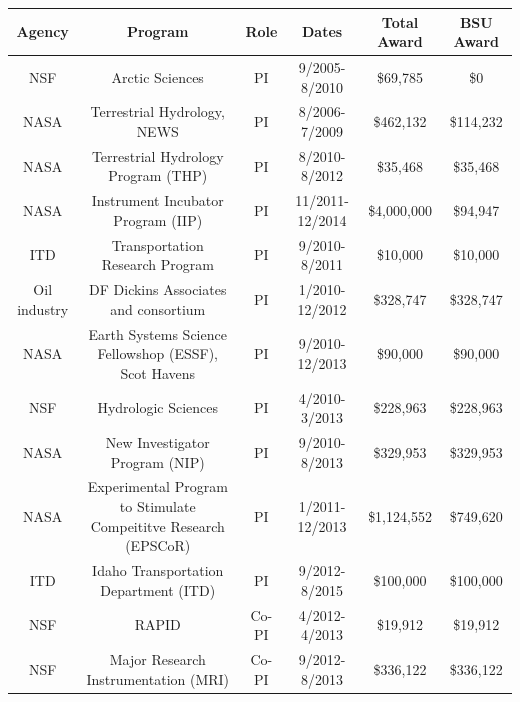 \documentclass[11pt]{article}
\begin{document}
\begin{table}[!htbp]
\tiny
\begin{tabular}{cccccc}
Agency           & Program                                                                 & Role  & Dates            & Total Award & BSU Award \\ \hline
NSF              & Arctic Sciences                                                         & PI    & 9/2005-8/2010    & \$69,785     & \$0  \\
NASA             & Terrestrial Hydrology, NEWS                                             & PI    & 8/2006-7/2009    & \$462,132    & \$114,232  \\
NASA             & Terrestrial Hydrology Program (THP)                                     & PI    & 8/2010-8/2012    & \$35,468     & \$35,468  \\
NASA             & Instrument Incubator Program (IIP)                                      & PI    & 11/2011-12/2014  & \$4,000,000  & \$94,947  \\
ITD              & Transportation Research Program                                         & PI    & 9/2010-8/2011    & \$10,000     & \$10,000 \\
Oil industry     & DF Dickins Associates and consortium                                    & PI    & 1/2010-12/2012   & \$328,747    & \$328,747  \\
NASA             & Earth Systems Science Fellowshop (ESSF), Scot Havens                    & PI    & 9/2010-12/2013   & \$90,000     & \$90,000  \\
NSF              & Hydrologic Sciences                                                     & PI    & 4/2010-3/2013    & \$228,963    & \$228,963 \\
NASA             & New Investigator Program (NIP)                                          & PI    & 9/2010-8/2013    & \$329,953    & \$329,953  \\
NASA             & Experimental Program to Stimulate Compeititve Research (EPSCoR)         & PI    & 1/2011-12/2013   & \$1,124,552  & \$749,620 \\
ITD              & Idaho Transportation Department (ITD)                                   & PI    & 9/2012-8/2015    & \$100,000    & \$100,000  \\
NSF              & RAPID                                                                   & Co-PI & 4/2012-4/2013    & \$19,912     & \$19,912  \\
NSF              & Major Research Instrumentation (MRI)                                    & Co-PI & 9/2012-8/2013    & \$336,122    & \$336,122 \\

\end{tabular}
\end{table}
\end{document}
